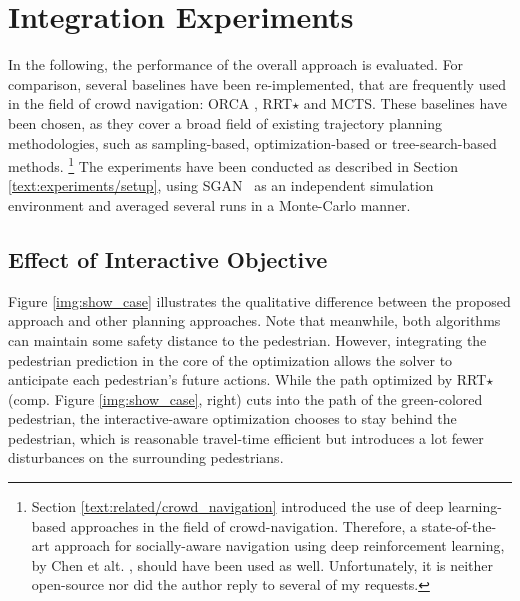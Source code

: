 \section{Integration Experiments}
\label{text:experiments/integration}
In the following, the performance of the overall approach is evaluated. For comparison, several baselines have been re-implemented, that are frequently used in the field of crowd navigation: \ac{ORCA} \cite{vandenBerg2011}, \ac{RRT}$\star$ \cite{Karaman2011} and \ac{MCTS}. These baselines have been chosen, as they cover a broad field of existing trajectory planning methodologies, such as sampling-based, optimization-based or tree-search-based methods. \footnote{Section \ref{text:related/crowd_navigation} introduced the use of deep learning-based approaches in the field of crowd-navigation. Therefore, a state-of-the-art approach for socially-aware navigation using deep reinforcement learning, by Chen et alt. \cite{Chen2017}, should have been used as well. Unfortunately, it is neither open-source nor did the author reply to several of my requests.} The experiments have been conducted as described in Section \ref{text:experiments/setup}, using \ac{SGAN} \cite{Gupta2018} as an independent simulation environment and averaged several runs in a Monte-Carlo manner.

\subsection{Effect of Interactive Objective}
Figure \ref{img:show_case} illustrates the qualitative difference between the proposed approach and other planning approaches. Note that meanwhile, both algorithms can maintain some safety distance to the pedestrian. However, integrating the pedestrian prediction in the core of the optimization allows the solver to anticipate each pedestrian's future actions. While the path optimized by \ac{RRT}$\star$ (comp. Figure \ref{img:show_case}, right) cuts into the path of the green-colored pedestrian, the interactive-aware optimization chooses to stay behind the pedestrian, which is reasonable travel-time efficient but introduces a lot fewer disturbances on the surrounding pedestrians. 

